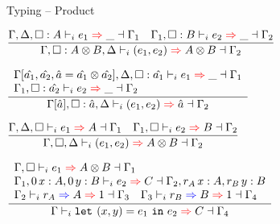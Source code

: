 \documentclass{beamer}
\begin{document}
\begin{frame}{Typing -- Product}

\begin{center}
  $\infrule{\infer{\Gamma, \Delta, \typehint{A}}{e_1}{\_}{\Gamma_1} \quad \infer{\Gamma_1, \typehint{B}}{e_2}{\_}{\Gamma_2}}{\infer{\Gamma, \typehint{\Prod{A}{B}}, \Delta}{\pair{e_1}{e_2}}{\Prod{A}{B}}{\Gamma_2}}$

  \vspace{2em}

  $\infrule{\begin{array}{l} \infer{\holectx{\Gamma}{\evar{a_1}, \evar{a_2}, \evar{a}[\Prod{\evar{a_1}}{\evar{a_2}}]}, \Delta, \typehint{\evar{a_1}}}{e_1}{\_}{\Gamma_1} \\ \infer{\Gamma_1, \typehint{\evar{a_2}}}{e_2}{\_}{\Gamma_2} \end{array}}{\infer{\holectx{\Gamma}{\evar{a}}, \typehint{\evar{a}}, \Delta}{\pair{e_1}{e_2}}{\evar{a}}{\Gamma_2}}$

  \vspace{2em}

  $\infrule{\infer{\Gamma, \Delta, \emptyhint}{e_1}{A}{\Gamma_1} \quad \infer{\Gamma_1, \emptyhint}{e_2}{B}{\Gamma_2}}{\infer{\Gamma, \emptyhint, \Delta}{\pair{e_1}{e_2}}{\Prod{A}{B}}{\Gamma_2}}$

  \vspace{2em}

  $\infrule{\begin{array}{l} \infer{\Gamma, \emptyhint}{e_1}{\Prod{A}{B}}{\Gamma_1} \\ \infer{\Gamma_1, \var[\Zero]{x}{A}, \var[\Zero]{y}{B}}{e_2}{C}{\Gamma_2, \var[r_A]{x}{A}, \var[r_B]{y}{B}} \\ \newkinding{\Gamma_2}{r_A}{A}{\One}{\Gamma_3} \quad \newkinding{\Gamma_3}{r_B}{B}{\One}{\Gamma_4} \end{array}}{\infer{\Gamma}{\letpair{x}{y}{e_1}{e_2}}{C}{\Gamma_4}}$
\end{center}

\end{frame}

\end{document}
